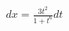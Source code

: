 \documentclass[preview]{standalone}
\begin{document}
\begin{align*}
dx = \frac{3t^2}{1+t^6}dt
\end{align*}
\end{document}
